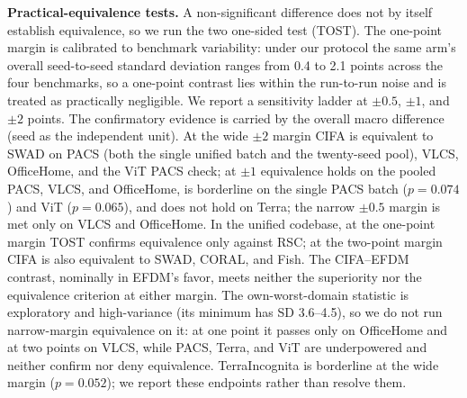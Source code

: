 \documentclass[electronics,article,submit,moreauthors]{Definitions/mdpi}
\newcommand{\add}[1]{\textcolor{addblue}{#1}}
\newcommand{\del}[1]{\textcolor{delred}{\st{#1}}}
\def\add#1{#1}%
\def\del#1{}%
\renewcommand{\add}[1]{#1}
\renewcommand{\del}[1]{}
\begin{document}
\del{\textbf{Practical-equivalence tests.} A non-significant difference does not by itself establish equivalence, so we run the two one-sided test (TOST) against a pre-specified one-point margin. On PACS the pooled twenty-seed CIFA--SWAD 90\% confidence interval lies entirely inside the margin, establishing practical equivalence; in the unified codebase CIFA is likewise equivalent to CORAL, RSC, and Fish, while the CIFA--EFDM contrast, although nominally in EFDM's favor, decisively meets neither the superiority nor (at the strictest adjustment) the equivalence criterion. The overall CIFA--SWAD 90\% intervals also fall entirely inside the margin on VLCS and OfficeHome, as does the OfficeHome worst-domain interval. On TerraIncognita and the remaining worst-domain endpoints the intervals exclude neither a small gain nor equivalence, which we report rather than resolve.}\add{\textbf{Practical-equivalence tests.} A non-significant difference does not by itself establish equivalence, so we run the two one-sided test (TOST). The one-point margin is calibrated to benchmark variability: under our protocol the same arm's overall seed-to-seed standard deviation ranges from 0.4 to 2.1 points across the four benchmarks, so a one-point contrast lies within the run-to-run noise and is treated as practically negligible. We report a sensitivity ladder at $\pm0.5$, $\pm1$, and $\pm2$ points. The confirmatory evidence is carried by the overall macro difference (seed as the independent unit). At the wide $\pm2$ margin CIFA is equivalent to SWAD on PACS (both the single unified batch and the twenty-seed pool), VLCS, OfficeHome, and the ViT PACS check; at $\pm1$ equivalence holds on the pooled PACS, VLCS, and OfficeHome, is borderline on the single PACS batch ($p=0.074$) and ViT ($p=0.065$), and does not hold on Terra; the narrow $\pm0.5$ margin is met only on VLCS and OfficeHome. In the unified codebase, at the one-point margin TOST confirms equivalence only against RSC; at the two-point margin CIFA is also equivalent to SWAD, CORAL, and Fish. The CIFA--EFDM contrast, nominally in EFDM's favor, meets neither the superiority nor the equivalence criterion at either margin. The own-worst-domain statistic is exploratory and high-variance (its minimum has SD 3.6--4.5), so we do not run narrow-margin equivalence on it: at one point it passes only on OfficeHome and at two points on VLCS, while PACS, Terra, and ViT are underpowered and neither confirm nor deny equivalence. TerraIncognita is borderline at the wide margin ($p=0.052$); we report these endpoints rather than resolve them.}
\end{document}
